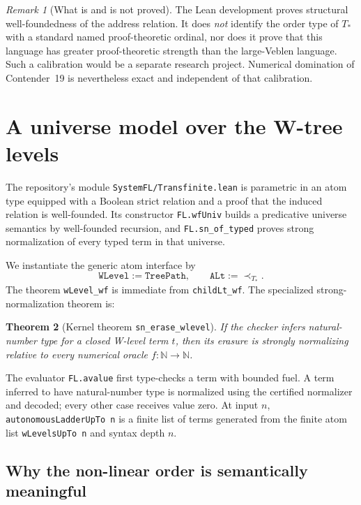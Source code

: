 \documentclass[11pt]{article}
\newtheorem{theorem}{Theorem}[section]
\theoremstyle{definition}
\theoremstyle{remark}
\newtheorem{remark}[theorem]{Remark}
\begin{document}
\begin{remark}[What is and is not proved]
The Lean development proves structural well-foundedness of the address
relation.  It does \emph{not} identify the order type of $T_{\!*}$ with a
standard named proof-theoretic ordinal, nor does it prove that this language
has greater proof-theoretic strength than the large-Veblen language.  Such a
calibration would be a separate research project.  Numerical domination of
Contender~19 is nevertheless exact and independent of that calibration.
\end{remark}

\section{A universe model over the W-tree levels}
\label{sec:language}

The repository's module \texttt{SystemFL/Transfinite.lean} is parametric in an
atom type equipped with a Boolean strict relation and a proof that the induced
relation is well-founded.  Its constructor \texttt{FL.wfUniv} builds a
predicative universe semantics by well-founded recursion, and
\texttt{FL.sn\_of\_typed} proves strong normalization of every typed term in
that universe.

We instantiate the generic atom interface by
\[
  \texttt{WLevel}:=\texttt{TreePath},
  \qquad
  \texttt{ALt}:=\prec_{T_{\!*}}.
\]
The theorem \texttt{wLevel\_wf} is immediate from \texttt{childLt\_wf}.  The
specialized strong-normalization theorem is:

\begin{theorem}[Kernel theorem \texttt{sn\_erase\_wlevel}]
If the checker infers natural-number type for a closed W-level term $t$, then
its erasure is strongly normalizing relative to every numerical oracle
$f:\mathbb N\to\mathbb N$.
\end{theorem}

The evaluator \texttt{FL.avalue} first type-checks a term with bounded fuel.  A
term inferred to have natural-number type is normalized using the certified
normalizer and decoded; every other case receives value zero.  At input $n$,
\texttt{autonomousLadderUpTo n} is a finite list of terms generated from the
finite atom list \texttt{wLevelsUpTo n} and syntax depth $n$.

\subsection{Why the non-linear order is semantically meaningful}
\end{document}
